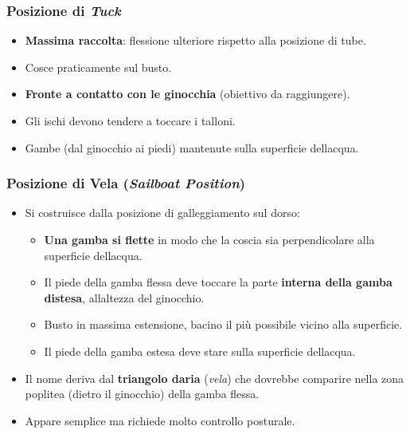 \documentclass[a4paper,11pt]{article}
\providecommand{\tightlist}{%
  \setlength{\itemsep}{0pt}\setlength{\parskip}{0pt}}
\begin{document}
\subsubsection{\texorpdfstring{Posizione di
            \emph{Tuck}}{Posizione di Tuck}}\label{posizione-di-tuck}

\begin{itemize}
      \tightlist
      \item
            \textbf{Massima raccolta}: flessione ulteriore rispetto alla posizione
            di tube.
      \item
            Cosce praticamente sul busto.
      \item
            \textbf{Fronte a contatto con le ginocchia} (obiettivo da
            raggiungere).
      \item
            Gli ischi devono tendere a toccare i talloni.
      \item
            Gambe (dal ginocchio ai piedi) mantenute sulla superficie
            dell\textquotesingle acqua.
\end{itemize}

\subsubsection{\texorpdfstring{Posizione di Vela (\emph{Sailboat
                  Position})}{Posizione di Vela (Sailboat Position)}}\label{posizione-di-vela-sailboat-position}

\begin{itemize}
      \tightlist
      \item
            Si costruisce dalla posizione di galleggiamento sul dorso:

            \begin{itemize}
                  \tightlist
                  \item
                        \textbf{Una gamba si flette} in modo che la coscia sia
                        perpendicolare alla superficie dell\textquotesingle acqua.
                  \item
                        Il piede della gamba flessa deve toccare la parte \textbf{interna
                              della gamba distesa}, all\textquotesingle altezza del ginocchio.
                  \item
                        Busto in massima estensione, bacino il più possibile vicino alla
                        superficie.
                  \item
                        Il piede della gamba estesa deve stare sulla superficie
                        dell\textquotesingle acqua.
            \end{itemize}
      \item
            Il nome deriva dal \textbf{triangolo d\textquotesingle aria}
            (\emph{vela}) che dovrebbe comparire nella zona poplitea (dietro il
            ginocchio) della gamba flessa.
      \item
            Appare semplice ma richiede molto controllo posturale.
\end{itemize}
\end{document}

